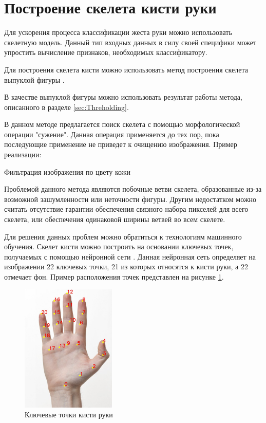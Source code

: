 \section{Построение скелета кисти руки}
\label{sec:Skeleton}

Для ускорения процесса классификации жеста руки можно использовать скелетную модель. Данный тип входных данных в силу своей специфики может упростить вычисление признаков, необходимых классификатору.

Для построения скелета кисти можно использовать метод построения скелета выпуклой фигуры \cite{DIP}. 

В качестве выпуклой фигуры можно использовать результат работы метода, описанного в разделе \ref{sec:Threholding}.

В данном методе предлагается поиск скелета с помощью морфологической операции "сужение". Данная операция применяется до тех пор, пока последующие применение не приведет к очищению изображения. Пример реализации:

\begin{minipage}{0.75\textwidth}
	\begin{algorithm}[H]
		
		\caption{Фильтрация изображения по цвету кожи}
		\label{imp:ske-opencv}
	\end{algorithm}
\end{minipage}

Проблемой данного метода являются побочные ветви скелета, образованные из-за возможной зашумленности или неточности фигуры. Другим недостатком можно считать отсутствие гарантии обеспечения связного набора пикселей для всего скелета, или обеспечения одинаковой ширины ветвей во всем скелете.

Для решения данных проблем можно обратиться к технологиям машинного обучения. Скелет кисти можно построить на основании ключевых точек, получаемых с помощью нейронной сети \cite{DNN}. Данная нейронная сеть определяет на изображении 22 ключевых точки, 21 из которых относятся к кисти руки, а 22 отмечает фон. Пример расположения точек представлен на рисунке \ref{fig:keypoints}.

\begin{figure}[!h]
	\centering
	\includegraphics[width=0.4\textwidth,keepaspectratio]{figures/ru/handpose-demo-keypoints}
	\caption{Ключевые точки кисти руки}
	\label{fig:keypoints}
\end{figure}


